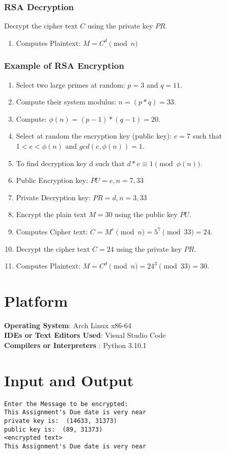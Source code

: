 \documentclass[11pt]{article}
\begin{document}
\subsubsection{RSA Decryption}
Decrypt the cipher text $C$ using the private key $PR$.
\begin{enumerate}
	\item Computes Plaintext: $M = C^d \pmod{n}$
\end{enumerate}

\subsubsection{Example of RSA Encryption}
\begin{enumerate}
	\item Select two large primes at random: $p = 3$ and $q = 11$.
	\item Compute their system modulus: $n = (p*q) = 33$.
	\item Compute: $\phi(n) = (p-1)*(q-1) = 20$.
	\item Select at random the encryption key (public key): $e = 7$ such that $1 < e < \phi(n)$ and $gcd(e, \phi(n)) = 1$.
	\item To find decryption key d such that $d*e \equiv 1 \pmod{\phi(n)}$.
	\item Public Encryption key: $PU = {e, n} = {7, 33}$
	\item Private Decryption key: $PR = {d, n} = {3, 33}$
	\item Encrypt the plain text $M = 30$ using the public key $PU$.
	\item Computes Cipher text: $C = M^e \pmod{n} = 5^7 \pmod{33} = 24$.
	\item Decrypt the cipher text $C = 24$ using the private key $PR$.
	\item Computes Plaintext: $M = C^d \pmod{n} = 24^3 \pmod{33} = 30$.
\end{enumerate}

\section{Platform}
\textbf{Operating System}: Arch Linux x86-64 \\
\textbf{IDEs or Text Editors Used}: Visual Studio Code\\
\textbf{Compilers or Interpreters} : Python 3.10.1\\

\section{Input and Output}
\begin{verbatim}
Enter the Message to be encrypted: 
This Assignment's Due date is very near
private key is:  (14633, 31373)
public key is:  (89, 31373)
<encrypted text>
This Assignment's Due date is very near
\end{verbatim}
\end{document}

